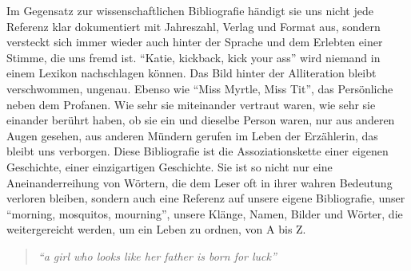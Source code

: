 \documentclass[a4paper,
fontsize=11pt,
oneside,
numbers=noperiodatend,
parskip=half-,
bibliography=totoc,
final
]{scrartcl}
\begin{document}
Im Gegensatz zur wissenschaftlichen Bibliografie händigt sie uns nicht
jede Referenz klar dokumentiert mit Jahreszahl, Verlag und Format aus,
sondern versteckt sich immer wieder auch hinter der Sprache und dem
Erlebten einer Stimme, die uns fremd ist. \enquote{Katie, kickback, kick
your ass} wird niemand in einem Lexikon nachschlagen können. Das Bild
hinter der Alliteration bleibt verschwommen, ungenau. Ebenso wie
\enquote{Miss Myrtle, Miss Tit}, das Persönliche neben dem Profanen. Wie
sehr sie miteinander vertraut waren, wie sehr sie einander berührt
haben, ob sie ein und dieselbe Person waren, nur aus anderen Augen
gesehen, aus anderen Mündern gerufen im Leben der Erzählerin, das bleibt
uns verborgen. Diese Bibliografie ist die Assoziationskette einer
eigenen Geschichte, einer einzigartigen Geschichte. Sie ist so nicht nur
eine Aneinanderreihung von Wörtern, die dem Leser oft in ihrer wahren
Bedeutung verloren bleiben, sondern auch eine Referenz auf unsere eigene
Bibliografie, unser \enquote{morning, mosquitos, mourning}, unsere
Klänge, Namen, Bilder und Wörter, die weitergereicht werden, um ein
Leben zu ordnen, von A bis Z.

\begin{quote}
\emph{\enquote{a girl who looks like her father is born for luck}}
\end{quote}

\end{document}
